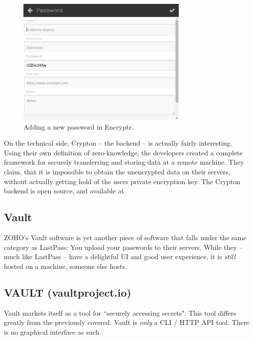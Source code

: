 			\begin{figure}[htbp]
				\centering
				\includegraphics[width=0.75\textwidth]{figures/analysis/encryptr_newpassword_main.png}
				\caption{Adding a new password in Encryptr.}
				\label{fig:encryptr_newpassword}
			\end{figure}

			On the technical side, Crypton -- the backend -- is actually fairly interesting. Using their own definition of zero-knowledge, the developers created a complete framework for securely transferring and storing data at a remote machine\cite{crypton_paper}. They claim, that it is impossible to obtain the unencrypted data on their servers, without actually getting hold of the users private encryption key. The Crypton backend is open source, and available at \cite{crypton_git}








		\subsection{Vault}
			ZOHO's Vault software is yet another piece of software that falls under the same category as LastPass: You upload your passwords to their servers. While they -- much like LastPass -- have a delightful UI and good user experience, it is \emph{still} hosted on a machine, someone else hosts.

			
		\subsection{VAULT (vaultproject.io)}
			Vault markets itself as a tool for ``securely accessing secrets". This tool differs greatly from the previously covered. Vault is \emph{only} a CLI / HTTP API tool. There is no graphical interface as such.

